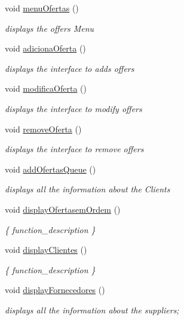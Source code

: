 \begin{DoxyCompactItemize}
void \hyperlink{classEmpresa_a3cab1a61ff84c5b20ac2faa6251e25ed}{menu\+Ofertas} ()
\begin{DoxyCompactList}\small\item\em displays the offers Menu \end{DoxyCompactList}\item 
void \hyperlink{classEmpresa_ae244a8ae3afb85eb5e9e5febce8b8728}{adiciona\+Oferta} ()
\begin{DoxyCompactList}\small\item\em displays the interface to adds offers \end{DoxyCompactList}\item 
void \hyperlink{classEmpresa_ac8948065c65d5c02cb30103118f502d4}{modifica\+Oferta} ()
\begin{DoxyCompactList}\small\item\em displays the interface to modify offers \end{DoxyCompactList}\item 
void \hyperlink{classEmpresa_a5b5c42d733ccee37f932db5db8aec243}{remove\+Oferta} ()
\begin{DoxyCompactList}\small\item\em displays the interface to remove offers \end{DoxyCompactList}\item 
void \hyperlink{classEmpresa_a5ca8821d938f11f29558ae90913de528}{add\+Ofertas\+Queue} ()
\begin{DoxyCompactList}\small\item\em displays all the information about the Clients \end{DoxyCompactList}\item 
void \hyperlink{classEmpresa_acd458614a3cca3f432b54212a2e72584}{display\+Ofertasem\+Ordem} ()
\begin{DoxyCompactList}\small\item\em \{ function\+\_\+description \} \end{DoxyCompactList}\item 
void \hyperlink{classEmpresa_a28e04d59daa7206bec6055249ce17410}{display\+Clientes} ()
\begin{DoxyCompactList}\small\item\em \{ function\+\_\+description \} \end{DoxyCompactList}\item 
void \hyperlink{classEmpresa_a55c3756c01b45b41ad03f4e4f3e4dcac}{display\+Fornecedores} ()
\begin{DoxyCompactList}\small\item\em displays all the information about the suppliers; \end{DoxyCompactList}\item 

\end{DoxyCompactItemize}
